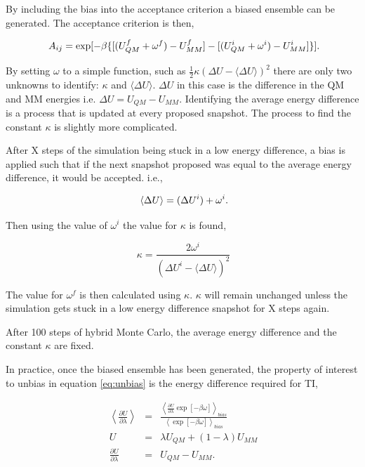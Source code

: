 By including the bias into the acceptance criterion a biased ensemble can be generated.  The acceptance criterion is then,

\begin{equation}
\ A_{ij} = \exp[ - \beta \{[( U_{QM}^f + \omega^f ) - U_{MM}^f ] - [(U_{QM}^i+ \omega^i) - U_{MM}^i]\}] \\.
\end{equation}

By setting $\omega$ to a simple function, such as $\frac{1}{2} \kappa (\Delta U- \langle \Delta U \rangle)^2$ there are only two unknowns to identify: $\kappa$ and $\langle \Delta U \rangle$.  $\Delta U$ in this case is the difference in the QM and MM energies i.e. $\Delta U = U_{QM} - U_{MM}$.  Identifying the average energy difference is a process that is updated at every proposed snapshot.  The process to find the constant $\kappa$ is slightly more complicated.

After X steps of the simulation being stuck in a low energy difference, a bias is applied such that if the next snapshot proposed was equal to the average energy difference, it would be accepted. i.e., 

\begin{equation}
\ \langle \Delta U \rangle =  (\Delta U^i)+ \omega^i \\.
\end{equation}

Then using the value of $\omega^i$ the value for $\kappa$ is found,

\begin{equation}
\ \kappa=\frac{2 \omega^i}{(\Delta U^i - \langle \Delta U \rangle)^2}
\end{equation}

The value for $\omega^f$ is then calculated using $\kappa$. $\kappa$ will remain unchanged unless the simulation gets stuck in a low energy difference snapshot for X steps again.

After 100 steps of hybrid Monte Carlo, the average energy difference and the constant $\kappa$ are fixed.

In practice, once the biased ensemble has been generated, the property of interest to unbias in equation \ref{eq:unbias} is the energy difference required for TI,

\begin{eqnarray}
\ \left\langle \frac{\partial U}{\partial \lambda} \right\rangle &=& \frac{\left\langle \frac{\partial U}{\partial \lambda} \exp[-\beta \omega] \right\rangle_{bias}}{\left\langle \exp[-\beta \omega] \right\rangle_{bias}} \\
\ U &=& \lambda U_{QM} + (1-\lambda) U_{MM} \\
\ \frac{\partial U}{\partial \lambda} &=& U_{QM} - U_{MM} .
\end{eqnarray}

